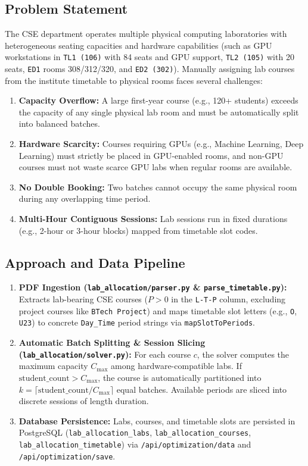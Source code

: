 \documentclass[12pt,a4paper]{article}
\begin{document}
\subsection{Problem Statement}
The CSE department operates multiple physical computing laboratories with heterogeneous seating capacities and hardware capabilities (such as GPU workstations in \texttt{TL1 (106)} with 84 seats and GPU support, \texttt{TL2 (105)} with 20 seats, \texttt{ED1} rooms 308/312/320, and \texttt{ED2 (302)}). Manually assigning lab courses from the institute timetable to physical rooms faces several challenges:
\begin{enumerate}[leftmargin=*]
    \item \textbf{Capacity Overflow:} A large first-year course (e.g., 120+ students) exceeds the capacity of any single physical lab room and must be automatically split into balanced batches.
    \item \textbf{Hardware Scarcity:} Courses requiring GPUs (e.g., Machine Learning, Deep Learning) must strictly be placed in GPU-enabled rooms, and non-GPU courses must not waste scarce GPU labs when regular rooms are available.
    \item \textbf{No Double Booking:} Two batches cannot occupy the same physical room during any overlapping time period.
    \item \textbf{Multi-Hour Contiguous Sessions:} Lab sessions run in fixed durations (e.g., 2-hour or 3-hour blocks) mapped from timetable slot codes.
\end{enumerate}

\subsection{Approach and Data Pipeline}
\begin{enumerate}[leftmargin=*]
    \item \textbf{PDF Ingestion (\texttt{lab\_allocation/parser.py} \& \texttt{parse\_timetable.py}):} Extracts lab-bearing CSE courses ($P > 0$ in the \texttt{L-T-P} column, excluding project courses like \texttt{BTech Project}) and maps timetable slot letters (e.g., \texttt{O}, \texttt{U23}) to concrete \texttt{Day\_Time} period strings via \texttt{mapSlotToPeriods}.
    \item \textbf{Automatic Batch Splitting \& Session Slicing (\texttt{lab\_allocation/solver.py}):} For each course $c$, the solver computes the maximum capacity $C_{\max}$ among hardware-compatible labs. If $\text{student\_count} > C_{\max}$, the course is automatically partitioned into $k = \lceil \text{student\_count} / C_{\max} \rceil$ equal batches. Available periods are sliced into discrete sessions of length $\text{duration}$.
    \item \textbf{Database Persistence:} Labs, courses, and timetable slots are persisted in PostgreSQL (\texttt{lab\_allocation\_labs}, \texttt{lab\_allocation\_courses}, \texttt{lab\_allocation\_timetable}) via \texttt{/api/optimization/data} and \texttt{/api/optimization/save}.
\end{enumerate}
\end{document}
